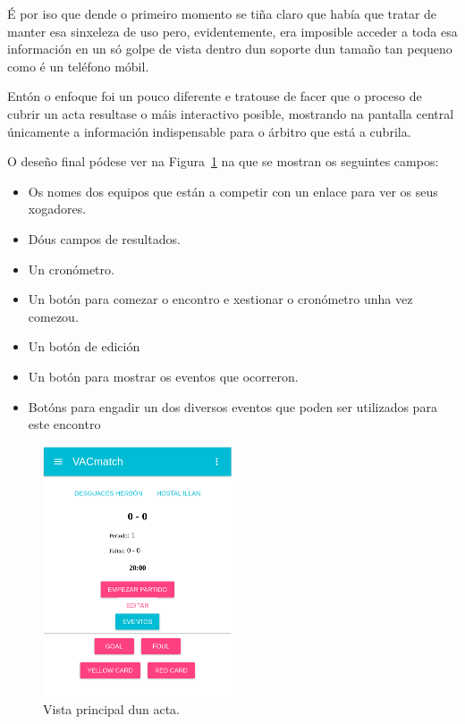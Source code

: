     É por iso que dende o primeiro momento se tiña claro que había que tratar 
de manter esa sinxeleza de uso pero, evidentemente, era imposible acceder a 
toda esa información en un só golpe de vista dentro dun soporte dun tamaño 
tan pequeno como é un teléfono móbil.

    Entón o enfoque foi un pouco diferente e tratouse de facer que o proceso de 
cubrir un acta resultase o máis interactivo posible, mostrando na pantalla 
central únicamente a información indispensable para o árbitro que está a 
cubrila.

    O deseño final pódese ver na Figura~\ref{fig:design:showreport} na que se 
mostran os seguintes campos:
    \begin{itemize}
     \item Os nomes dos equipos que están a competir con un enlace para ver os 
seus xogadores.
     \item Dóus campos de resultados.
     \item Un cronómetro.
     \item Un botón para comezar o encontro e xestionar o cronómetro unha vez 
comezou.
     \item Un botón de edición
     \item Un botón para mostrar os eventos que 
ocorreron.
     \item Botóns para engadir un dos diversos eventos que poden ser utilizados 
para este encontro
    \end{itemize}

    \begin{figure}[h!]
      \begin{center}
      \includegraphics[width=0.5\textwidth]{./img/demo/8_report.png}
      \caption{Vista principal dun acta.}
      \label{fig:design:showreport}
      \end{center}
    \end{figure}

